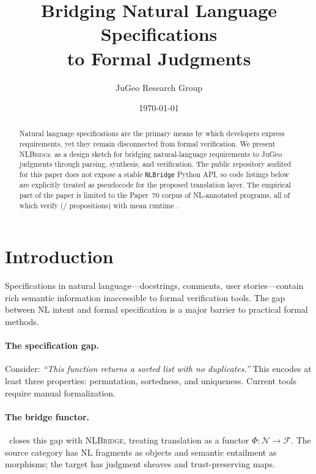 \documentclass[11pt]{article}
\title{\textbf{Bridging Natural Language Specifications\\
to Formal Judgments}}
\author{JuGeo Research Group}
\date{\today}
\newcommand{\NLBridge}{\textsc{NLBridge}}
\newcommand{\NLSpec}{\mathcal{N}}
\newcommand{\FormalSpec}{\mathcal{F}}
\newcommand{\SpecFunctor}{\Phi}
\begin{document}
\maketitle

\begin{abstract}
Natural language specifications are the primary means by which
developers express requirements, yet they remain disconnected from
formal verification. We present \NLBridge\ as a design sketch for bridging
natural-language requirements to JuGeo judgments through parsing, synthesis,
and verification. The public repository audited for this paper does not expose
a stable \texttt{NLBridge} Python API, so code listings below are explicitly
treated as pseudocode for the proposed translation layer. The empirical part
of the paper is limited to the Paper~70 corpus of
\ppLXXprogramCount{} NL-annotated programs, all of which verify
(\ppLXXpropsOk{}/\ppLXXpropsTotal{} propositions) with mean runtime
\ppLXXtimeMean{}.
\end{abstract}

\newpage

\section{Introduction}\label{sec:intro}

Specifications in natural language---docstrings, comments, user
stories---contain rich semantic information inaccessible to formal
verification tools.  The gap between NL intent and formal specification
is a major barrier to practical formal methods.

\paragraph{The specification gap.}
Consider: \emph{``This function returns a sorted list with no
duplicates.''} This encodes at least three properties: permutation,
sortedness, and uniqueness.  Current tools require manual formalization.

\paragraph{The bridge functor.}
\JuGeo\ closes this gap with \NLBridge, treating translation as a
functor $\SpecFunctor : \NLSpec \to \FormalSpec$.  The source category
has NL fragments as objects and semantic entailment as morphisms; the
target has judgment sheaves and trust-preserving maps.
\end{document}
